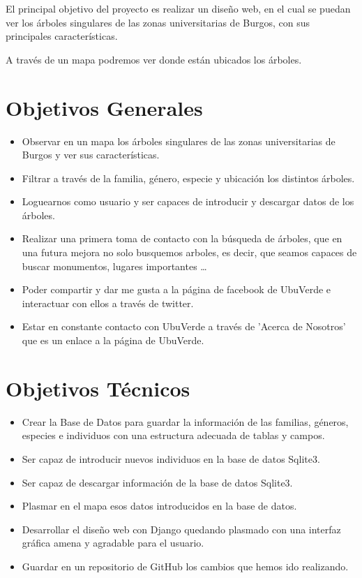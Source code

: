 
El principal objetivo del proyecto es realizar un diseño web, en el cual se puedan ver los árboles singulares de las zonas universitarias de Burgos, con sus principales características.

A través de un mapa podremos ver donde están ubicados los árboles. 
\section{Objetivos Generales}
\begin{itemize}
	\item Observar en un mapa los árboles singulares de las zonas universitarias de Burgos y ver sus características.
	\item Filtrar a través de la familia, género, especie y ubicación los distintos árboles.
	\item Loguearnos como usuario y ser capaces de introducir y descargar datos de los árboles.
	\item Realizar una primera toma de contacto con la búsqueda de árboles, que en una futura mejora no solo busquemos arboles, es decir, que seamos capaces de buscar monumentos, lugares importantes \ldots
	\item Poder compartir y dar me gusta a la página de facebook de UbuVerde e interactuar con ellos a través de twitter. 
	\item Estar en constante contacto con UbuVerde a través de 'Acerca de Nosotros' que es un enlace a la página de UbuVerde.
	
\end{itemize}
\newpage

\section{Objetivos Técnicos}
\begin{itemize}
	\item Crear la Base de Datos para guardar la información de las familias, géneros, especies e individuos con una estructura adecuada de tablas y campos.
	\item Ser capaz de introducir nuevos individuos en la base de datos Sqlite3.
	\item Ser capaz de descargar información de la base de datos Sqlite3.
	\item Plasmar en el mapa esos datos introducidos en la base de datos. 
	\item Desarrollar el diseño web con Django quedando plasmado con una interfaz gráfica amena y agradable para el usuario.
	\item Guardar en un repositorio de GitHub los cambios que hemos ido realizando.
	 
\end{itemize}
